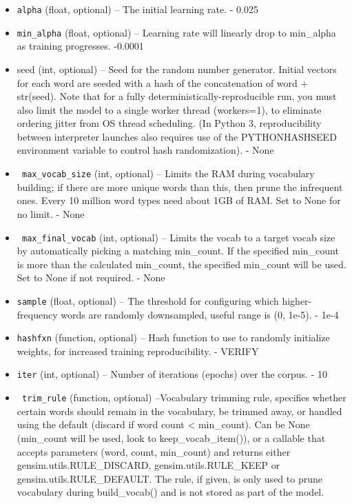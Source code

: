 \begin{itemize}
\item    \texttt{alpha} (float, optional) – The initial learning rate. - 0.025
 \item   \texttt{min\_alpha} (float, optional) – Learning rate will linearly drop to min\_alpha as training progresses. -0.0001
    \item seed (int, optional) – Seed for the random number generator. Initial vectors for each word are seeded with a hash of the concatenation of word + str(seed). Note that for a fully deterministically-reproducible run, you must also limit the model to a single worker thread (workers=1), to eliminate ordering jitter from OS thread scheduling. (In Python 3, reproducibility between interpreter launches also requires use of the PYTHONHASHSEED environment variable to control hash randomization). - None 
\item   \texttt{ max\_vocab\_size} (int, optional) – Limits the RAM during vocabulary building; if there are more unique words than this, then prune the infrequent ones. Every 10 million word types need about 1GB of RAM. Set to None for no limit. - None 
\item \texttt{   max\_final\_vocab} (int, optional) – Limits the vocab to a target vocab size by automatically picking a matching min\_count. If the specified min\_count is more than the calculated min\_count, the specified min\_count will be used. Set to None if not required. - None
 \item   \texttt{sample} (float, optional) – The threshold for configuring which higher-frequency words are randomly downsampled, useful range is (0, 1e-5). - 1e-4
   \item \texttt{hashfxn} (function, optional) – Hash function to use to randomly initialize weights, for increased training reproducibility. - VERIFY 
  \item  \texttt{iter} (int, optional) – Number of iterations (epochs) over the corpus. - 10 
 \item\texttt{   trim\_rule} (function, optional) –Vocabulary trimming rule, specifies whether certain words should remain in the vocabulary, be trimmed away, or handled using the default (discard if word count < min\_count). Can be None (min\_count will be used, look to keep\_vocab\_item()), or a callable that accepts parameters (word, count, min\_count) and returns either gensim.utils.RULE\_DISCARD, gensim.utils.RULE\_KEEP or gensim.utils.RULE\_DEFAULT. The rule, if given, is only used to prune vocabulary during build\_vocab() and is not stored as part of the model.


\end{itemize}
